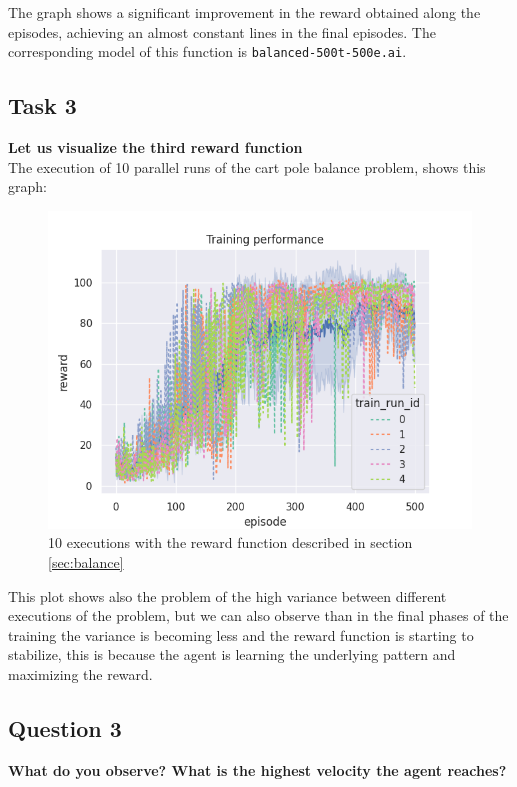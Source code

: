 \documentclass[12pt]{article}
\begin{document}
The graph shows a significant improvement in the reward obtained along the episodes, achieving an almost constant lines in the final episodes. The corresponding model of this function is \texttt{balanced-500t-500e.ai}.

\subsection{Task 3}
\label{sec:task-3-reward-viz}
\textbf {
    Let us visualize the third reward function
}\\

The execution of 10 parallel runs of the cart pole balance problem, shows this graph:

\begin{figure}[h]
    \centering
    \includegraphics[scale=0.5]{exercise-1/report/img/rewards/Figure_1-multiple.png}
    \caption{10 executions with the reward function described in section \ref{sec:balance}}
    \label{fig:my_label}
\end{figure}

This plot shows also the problem of the high variance between different executions of the problem, but we can also observe than in the final phases of the training the variance is becoming less and the reward function is starting to stabilize, this is because the agent is learning the underlying pattern and maximizing the reward.

\subsection{Question 3}
\label{sec:question-3}
\textbf {
    What do you observe? What is the highest velocity the agent reaches?
}\\
\end{document}
